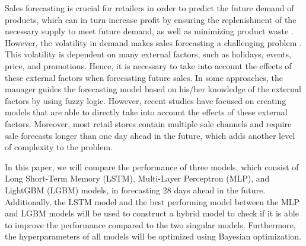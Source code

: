 Sales forecasting is crucial for retailers in order to predict the future demand of products, which can in turn increase profit by ensuring the replenishment of the necessary supply to meet future demand, as well as minimizing product waste \cite{c13}.
However, the volatility in demand makes sales forecasting a challenging problem \cite{c14}.
This volatility is dependent on many external factors, such as holidays, events, price, and promotions.
Hence, it is necessary to take into account the effects of these external factors when forecasting future sales.
In some approaches, the manager guides the forecasting model based on his/her knowledge of the external factors by using fuzzy logic.
However, recent studies have focused on creating models that are able to directly take into account the effects of these external factors.
Moreover, most retail stores contain multiple sale channels and require sale forecasts longer than one day ahead in the future, which adds another level of complexity to the problem.

In this paper, we will compare the performance of three models, which consist of Long Short-Term Memory (LSTM), Multi-Layer Perceptron (MLP), and LightGBM (LGBM) models, in forecasting 28 days ahead in the future.
Additionally, the LSTM model and the best performing model between the MLP and LGBM models will be used to construct a hybrid model to check if it is able to improve the performance compared to the two singular models.
Furthermore, the hyperparameters of all models will be optimized using Bayesian optimization.